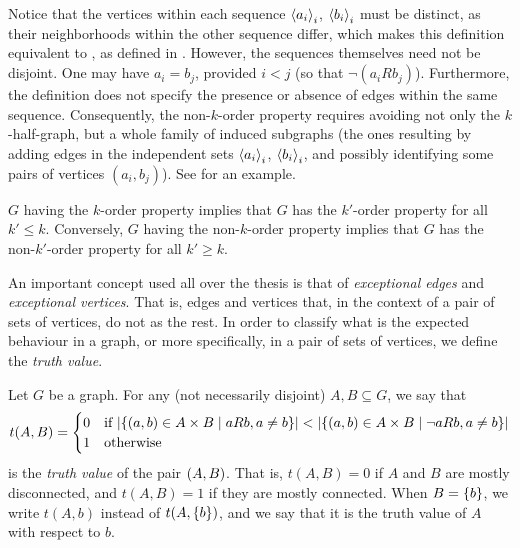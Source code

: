         \begin{remark}
            Notice that the vertices within each sequence $\left< a_i \right>_i$, $\left< b_i \right>_i$ must be distinct,
            as their neighborhoods within the other sequence differ, which makes this definition equivalent to
            , as defined in .
            However, the sequences themselves need not be disjoint.
            One may have $a_i=b_j$, provided $i < j$ (so that $\neg(a_i R b_j)$).
            Furthermore, the definition does not specify the presence or absence of edges within the same sequence.
            Consequently, the non-$k$-order property requires avoiding not only the $k$-half-graph, but a whole family
            of induced subgraphs (the ones resulting by adding edges in the independent sets
            $\left< a_i \right>_i$, $\left< b_i \right>_i$, and possibly identifying some pairs of vertices $(a_i, b_j)$).
            See  for an example.
        \end{remark}

        

        \begin{remark}
            $G$ having the $k$-order property implies that $G$ has the $k'$-order property for all $k' \leq k$.
            Conversely, $G$ having the non-$k$-order property implies that $G$ has the non-$k'$-order property for all $k' \geq k$.
        \end{remark}

        An important concept used all over the thesis is that of \emph{exceptional edges} and \emph{exceptional vertices}.
        That is, edges and vertices that, in the context of a pair of sets of vertices, do not  as the rest.
        In order to classify what is the expected behaviour in a graph, or more specifically, in a pair of sets of vertices,
        we define the \emph{truth value}.

        \begin{definition} \label{def:truth_value}
            Let $G$ be a graph.
            For any (not necessarily disjoint) $A, B \subseteq G$, we say that
            \[
                t(A,B) =
                \begin{cases}
                    0 & \text{if } | \{ ( a, b ) \in A \times B \mid a R b, a \neq b \} | <
                        | \{ ( a, b ) \in A \times B \mid \neg a R b, a \neq b \} | \\
                    1 & \text{otherwise}
                \end{cases}
            \]
            is the \emph{truth value} of the pair $( A,B )$.
            That is, $t(A,B) = 0$ if $A$ and $B$ are mostly disconnected, and $t(A,B) = 1$ if they are mostly connected.
            When $B = \{ b \}$, we write $t(A,b)$ instead of $t(A,\{ b \})$, and we say that it is the truth value of $A$
            with respect to $b$.
        \end{definition}


